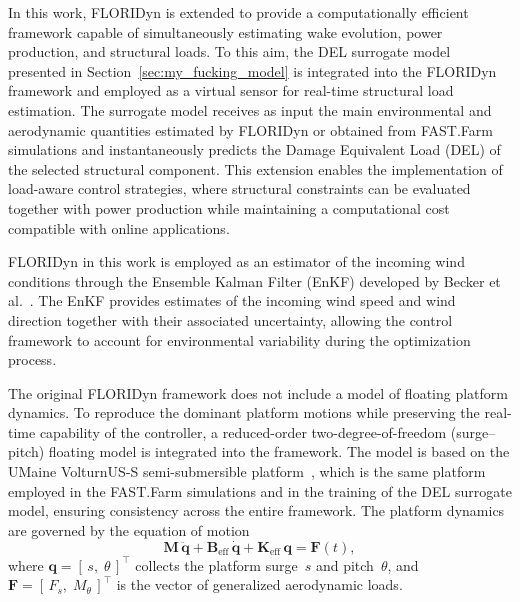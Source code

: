 \documentclass[final,5p,times,twocolumn]{elsarticle}
\begin{document}
In this work, FLORIDyn is extended to provide a computationally efficient framework capable of simultaneously estimating wake evolution, power production, and structural loads. To this aim, the DEL surrogate model presented in Section~\ref{sec:my_fucking_model} is integrated into the FLORIDyn framework and employed as a virtual sensor for real-time structural load estimation. The surrogate model receives as input the main environmental and aerodynamic quantities estimated by FLORIDyn or obtained from FAST.Farm simulations and instantaneously predicts the Damage Equivalent Load (DEL) of the selected structural component. This extension enables the implementation of load-aware control strategies, where structural constraints can be evaluated together with power production while maintaining a computational cost compatible with online applications.

FLORIDyn in this work is employed as an estimator of the incoming wind conditions through the Ensemble Kalman Filter (EnKF) developed by Becker et al.~\cite{https://doi.org/10.1002/we.70044}. The EnKF provides estimates of the incoming wind speed and wind direction together with their associated uncertainty, allowing the control framework to account for environmental variability during the optimization process.


The original FLORIDyn framework does not include a model of floating platform dynamics. To reproduce the dominant platform motions while preserving the real-time capability of the controller, a reduced-order two-degree-of-freedom (surge--pitch) floating model is integrated into the framework. The model is based on the UMaine VolturnUS-S semi-submersible platform~\cite{allen2020definition}, which is the same platform employed in the FAST.Farm simulations and in the training of the DEL surrogate model, ensuring consistency across the entire framework. The platform dynamics are governed by the equation of motion
%
\begin{equation}
\label{eq:float_eom}
\mathbf{M}\,\ddot{\mathbf{q}}
+ \mathbf{B}_{\mathrm{eff}}\,\dot{\mathbf{q}}
+ \mathbf{K}_{\mathrm{eff}}\,\mathbf{q}
= \mathbf{F}(t),
\end{equation}
%
where $\mathbf{q} = [\,s,\;\theta\,]^{\top}$ collects the platform surge~$s$ and pitch~$\theta$, and $\mathbf{F} = [\,F_{s},\;M_{\theta}\,]^{\top}$ is the vector of generalized aerodynamic loads.
 
 
\end{document}
